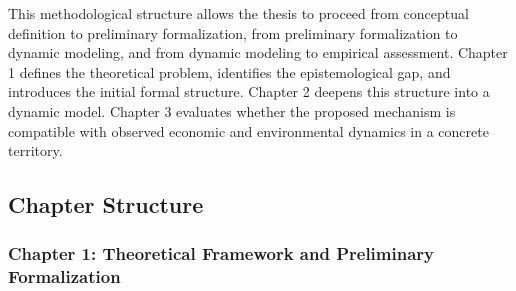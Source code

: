This methodological structure allows the thesis to proceed from conceptual definition to preliminary formalization, from preliminary formalization to dynamic modeling, and from dynamic modeling to empirical assessment. Chapter 1 defines the theoretical problem, identifies the epistemological gap, and introduces the initial formal structure. Chapter 2 deepens this structure into a dynamic model. Chapter 3 evaluates whether the proposed mechanism is compatible with observed economic and environmental dynamics in a concrete territory.

\subsection{Chapter Structure}

\subsubsection{Chapter 1: Theoretical Framework and Preliminary Formalization}

